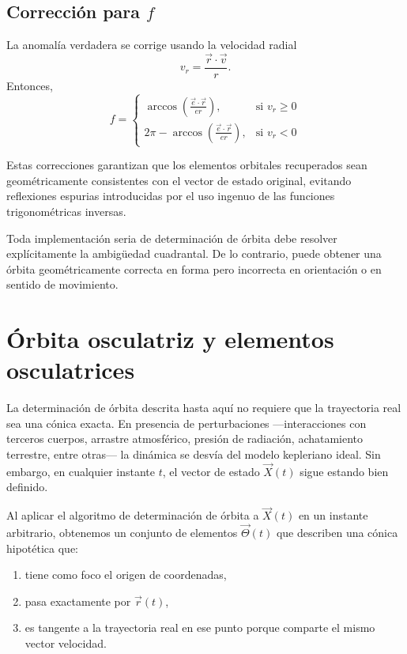 \subsection{Corrección para \texorpdfstring{$f$}{f}}
La anomalía verdadera se corrige usando la velocidad radial
\[
 v_r = \frac{\vec{r} \cdot \vec{v}}{r}.
\]
Entonces,
\[
 f =
\begin{cases}
\arccos\left(\frac{\vec{e} \cdot \vec{r}}{er}\right), & \text{si } v_r \ge 0 \\
2\pi - \arccos\left(\frac{\vec{e} \cdot \vec{r}}{er}\right), & \text{si } v_r < 0
\end{cases}
\]

Estas correcciones garantizan que los elementos orbitales recuperados sean geométricamente consistentes con el vector de estado original, evitando reflexiones espurias introducidas por el uso ingenuo de las funciones trigonométricas inversas.

\begin{importante}
Toda implementación seria de determinación de órbita debe resolver explícitamente la ambigüedad cuadrantal. De lo contrario, puede obtener una órbita geométricamente correcta en forma pero incorrecta en orientación o en sentido de movimiento.
\end{importante}

\section{Órbita osculatriz y elementos osculatrices}
La determinación de órbita descrita hasta aquí no requiere que la trayectoria real sea una cónica exacta. En presencia de perturbaciones —interacciones con terceros cuerpos, arrastre atmosférico, presión de radiación, achatamiento terrestre, entre otras— la dinámica se desvía del modelo kepleriano ideal. Sin embargo, en cualquier instante \(t\), el vector de estado \(\vec{X}(t)\) sigue estando bien definido.

Al aplicar el algoritmo de determinación de órbita a \(\vec{X}(t)\) en un instante arbitrario, obtenemos un conjunto de elementos \(\vec{\Theta}(t)\) que describen una cónica hipotética que:
\begin{enumerate}
    \item tiene como foco el origen de coordenadas,
    \item pasa exactamente por \(\vec{r}(t)\),
    \item es tangente a la trayectoria real en ese punto porque comparte el mismo vector velocidad.
\end{enumerate}

